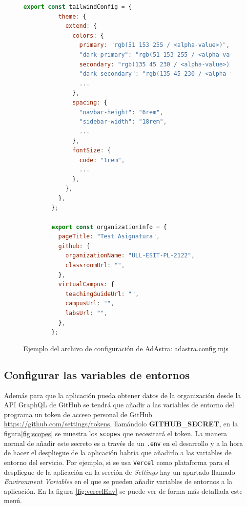 \begin{figure}
  \begin{lstlisting}[language=Javascript]
        export const tailwindConfig = {
          theme: {
            extend: {
              colors: {
                primary: "rgb(51 153 255 / <alpha-value>)",
                "dark-primary": "rgb(51 153 255 / <alpha-value>)",
                secondary: "rgb(135 45 230 / <alpha-value>)",
                "dark-secondary": "rgb(135 45 230 / <alpha-value>)",
                ...
              },
              spacing: {
                "navbar-height": "6rem",
                "sidebar-width": "18rem",
                ...
              },
              fontSize: {
                code: "1rem",
                ...
              },
            },
          },
        };
        
        export const organizationInfo = {
          pageTitle: "Test Asignatura",
          github: {
            organizationName: "ULL-ESIT-PL-2122",
            classroomUrl: "",
          },
          virtualCampus: {
            teachingGuideUrl: "",
            campusUrl: "",
            labsUrl: "",
          },
        };
    \end{lstlisting}
    \caption{Ejemplo del archivo de configuración de AdAstra: adastra.config.mjs}
    \label{fig:adastraConfig}
\end{figure}

\subsection{Configurar las variables de entornos}

Además para que la aplicación pueda obtener datos de la organización desde la API GraphQL de GitHub se tendrá que añadir a las variables de entorno del programa un token de acceso personal de GitHub \url{https://github.com/settings/tokens}, llamándolo \textbf{GITHUB\_SECRET}, en la figura\ref{fig:scopes} se muestra los \verb|scopes| que necesitará el token. La manera normal de añadir este secreto es a través de un \verb|.env| en el desarrollo y a la hora de hacer el despliegue de la aplicación habría que añadirlo a las variables de entorno del servicio. Por ejemplo, si se usa \verb|Vercel|\cite{vercel} como plataforma para el despliegue de la aplicación en la sección de \textit{Settings} hay un apartado llamado 
\textit{Environment Variables} en el que se pueden añadir variables de entornos a la aplicación. En la figura \ref{fig:vercelEnv} se puede ver de forma más detallada este menú.

